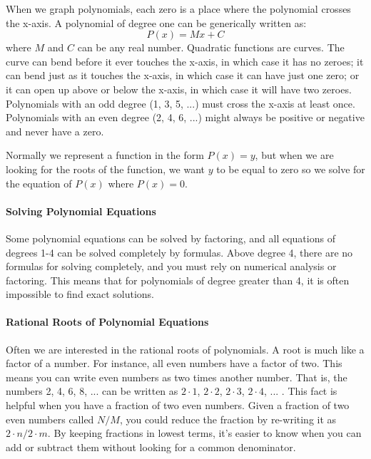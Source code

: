 When we graph polynomials, each zero is a place where the polynomial crosses the x-axis. A polynomial of degree one can be generically written as:
$$
P(x) = Mx + C
$$
where $M$ and $C$ can be any real number. Quadratic functions are curves. The curve can bend before it ever touches the x-axis, in which case it has no zeroes; it can bend just as it touches the x-axis, in which case it can have just one zero; or it can open up above or below the x-axis, in which case it will have two zeroes. Polynomials with an odd degree (1, 3, 5, ...) must cross the x-axis at least once. Polynomials with an even degree (2, 4, 6, ...) might always be positive or negative and never have a zero.



Normally we represent a function in the form $P(x) = y$, but when we are looking for the roots of the function, we want $y$ to be equal to zero so we solve for the equation of $P(x)$ where $P(x) = 0$.







\paragraph{Solving Polynomial Equations}



Some polynomial equations can be solved by factoring, and all equations of degrees 1-4 can be solved completely by formulas. Above degree 4, there are no formulas for solving completely, and you must rely on numerical analysis or factoring. This means that for polynomials of degree greater than 4, it is often impossible to find exact solutions.



\paragraph{Rational Roots of Polynomial Equations}



Often we are interested in the rational roots of polynomials. A root is much like a factor of a number. For instance, all even numbers have a factor of two. This means you can write even numbers as two times another number. That is, the numbers 2, 4, 6, 8, ... can be written as $2 \cdot 1$, $2 \cdot 2$, $2 \cdot 3$, $2 \cdot 4$, ... . This fact is helpful when you have a fraction of two even numbers. Given a fraction of two even numbers called $N/M$, you could reduce the fraction by re-writing it as $2 \cdot n / 2 \cdot m$. By keeping fractions in lowest terms, it's easier to know when you can add or subtract them without looking for a common denominator.



